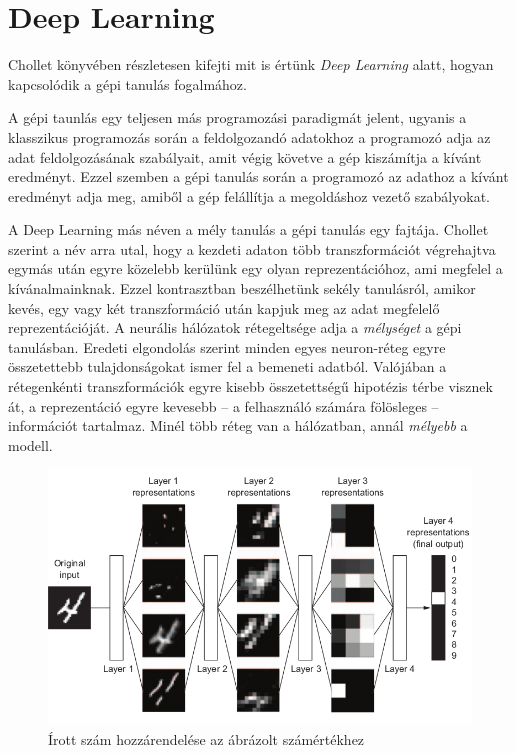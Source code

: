 \section{Deep Learning}
Chollet könyvében részletesen kifejti mit is értünk \emph{Deep Learning} alatt, hogyan kapcsolódik a gépi tanulás fogalmához.\cite{chollet}

A gépi taunlás egy teljesen más programozási paradigmát jelent, ugyanis a klasszikus programozás során a feldolgozandó adatokhoz a programozó adja az adat feldolgozásának szabályait, amit végig követve a gép kiszámítja a kívánt eredményt. Ezzel szemben a gépi tanulás során a programozó az adathoz  a kívánt eredményt adja meg, amiből a gép felállítja a megoldáshoz vezető szabályokat.%

A Deep Learning más néven a mély tanulás a gépi tanulás egy fajtája. Chollet szerint a név arra utal, hogy a kezdeti adaton több transzformációt végrehajtva egymás után egyre közelebb kerülünk egy olyan reprezentációhoz, ami megfelel a kívánalmainknak. Ezzel kontrasztban beszélhetünk sekély tanulásról, amikor kevés, egy vagy két transzformáció után kapjuk meg az adat megfelelő reprezentációját.%
A neurális hálózatok rétegeltsége adja a \emph{mélységet} a gépi tanulásban. Eredeti elgondolás szerint minden egyes neuron-réteg egyre összetettebb tulajdonságokat ismer fel a bemeneti adatból. Valójában a rétegenkénti transzformációk egyre kisebb összetettségű hipotézis térbe visznek át, a reprezentáció egyre kevesebb -- a felhasználó számára fölösleges -- információt tartalmaz. Minél több réteg van a hálózatban, annál \emph{mélyebb} a modell.

\begin{figure}[h]
	\centering
	\includegraphics[width=0.8\columnwidth]{fig/digit_classification.png}
	\caption{Írott szám hozzárendelése az ábrázolt számértékhez\protect\footnotemark}
	\label{fig:digit_classification}
\end{figure}

